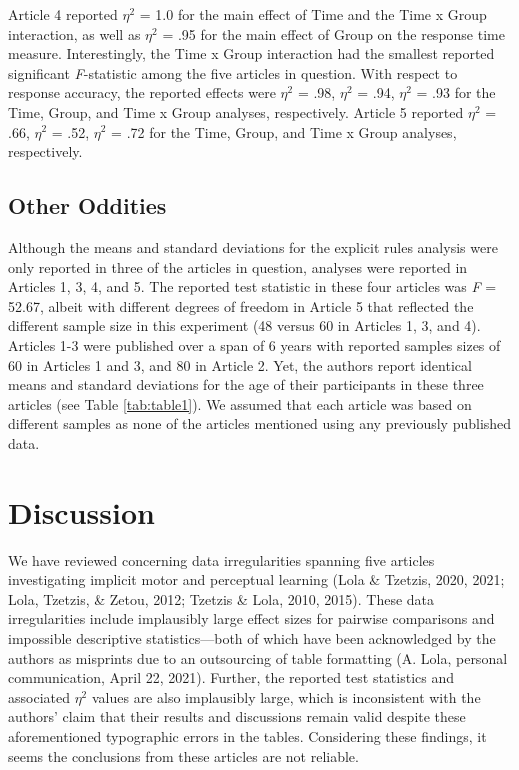 \documentclass[
  english,
  man,floatsintext]{apa7}
\begin{document}
Article 4 reported \(\eta^{2}\) = 1.0 for the main effect of Time and the Time x Group interaction, as well as \(\eta^{2}\) = .95 for the main effect of Group on the response time measure. Interestingly, the Time x Group interaction had the smallest reported significant \emph{F}-statistic among the five articles in question. With respect to response accuracy, the reported effects were \(\eta^{2}\) = .98, \(\eta^{2}\) = .94, \(\eta^{2}\) = .93 for the Time, Group, and Time x Group analyses, respectively. Article 5 reported \(\eta^{2}\) = .66, \(\eta^{2}\) = .52, \(\eta^{2}\) = .72 for the Time, Group, and Time x Group analyses, respectively.

\hypertarget{other-oddities}{%
\subsection{Other Oddities}\label{other-oddities}}

Although the means and standard deviations for the explicit rules analysis were only reported in three of the articles in question, analyses were reported in Articles 1, 3, 4, and 5. The reported test statistic in these four articles was \emph{F} = 52.67, albeit with different degrees of freedom in Article 5 that reflected the different sample size in this experiment (48 versus 60 in Articles 1, 3, and 4). Articles 1-3 were published over a span of 6 years with reported samples sizes of 60 in Articles 1 and 3, and 80 in Article 2. Yet, the authors report identical means and standard deviations for the age of their participants in these three articles (see Table \ref{tab:table1}). We assumed that each article was based on different samples as none of the articles mentioned using any previously published data.

\hypertarget{discussion}{%
\section{Discussion}\label{discussion}}

We have reviewed concerning data irregularities spanning five articles investigating implicit motor and perceptual learning (Lola \& Tzetzis, 2020, 2021; Lola, Tzetzis, \& Zetou, 2012; Tzetzis \& Lola, 2010, 2015). These data irregularities include implausibly large effect sizes for pairwise comparisons and impossible descriptive statistics---both of which have been acknowledged by the authors as misprints due to an outsourcing of table formatting (A. Lola, personal communication, April 22, 2021). Further, the reported test statistics and associated \(\eta^{2}\) values are also implausibly large, which is inconsistent with the authors' claim that their results and discussions remain valid despite these aforementioned typographic errors in the tables. Considering these findings, it seems the conclusions from these articles are not reliable.
\end{document}
